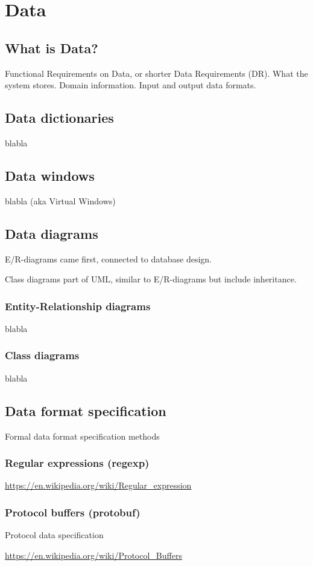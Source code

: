 
\chapter{Data}%

\section{What is Data?}

Functional Requirements on Data, or shorter Data Requirements (DR). What the system stores. Domain information. Input and output data formats.

\section{Data dictionaries}
blabla

\section{Data windows}
blabla  (aka Virtual Windows)


\section{Data diagrams}

E/R-diagrams came first, connected to database design.

Class diagrams part of UML, similar to E/R-diagrams but include inheritance.

\subsection{Entity-Relationship diagrams}
blabla

\subsection{Class diagrams}
blabla



\section{Data format specification}

Formal data format specification methods

\subsection{Regular expressions (regexp)}


\url{https://en.wikipedia.org/wiki/Regular_expression}


\subsection{Protocol buffers (protobuf)}

Protocol data specification

\url{https://en.wikipedia.org/wiki/Protocol_Buffers}
